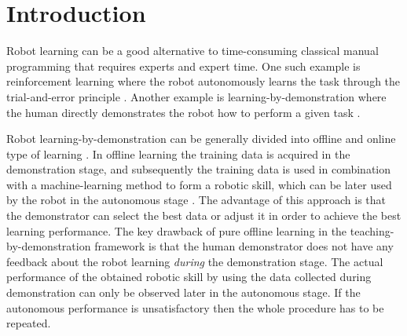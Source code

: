 


\section{Introduction}
\label{sec:introduction}
Robot learning can be a good alternative to time-consuming classical manual programming that requires experts and expert time. One such example is reinforcement learning where the robot autonomously learns the task through the trial-and-error principle \cite{Kober2012}. Another example is learning-by-demonstration where the human directly demonstrates the robot how to perform a given task \cite{Hersch2008,Evrard2009,Ude2010,Amor2009,Nguyen2009,Peternel2013b,Gams2009,Peternel2014}.

Robot learning-by-demonstration can be generally divided into offline and online type of learning \cite{Nguyen2011}. In offline learning the training data is acquired in the demonstration stage, and subsequently the training data is used in combination with a machine-learning method to form a robotic skill, which can be later used by the robot in the autonomous stage \cite{Hersch2008,Evrard2009,Ude2010,Ewerton2015}. The advantage of this approach is that the demonstrator can select the best data or adjust it in order to achieve the best learning performance. The key drawback of pure offline learning in the teaching-by-demonstration framework is that the human demonstrator does not have any feedback about the robot learning {\it during} the demonstration stage. The actual performance of the obtained robotic skill by using the data collected during demonstration can only be observed later in the autonomous stage. If the autonomous performance is unsatisfactory then the whole procedure has to be repeated.


